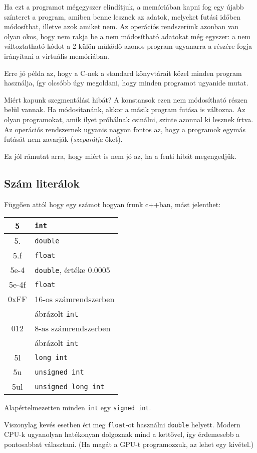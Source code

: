 \documentclass[a4paper,11.5pt]{article}
\begin{document}
	Ha ezt a programot mégegyszer elindítjuk, a memóriában kapni fog egy újabb színteret a program, amiben benne lesznek az adatok, melyeket futási időben módosíthat, illetve azok amiket nem. Az operációs rendszerünk azonban van olyan okos, hogy nem rakja be a nem módosítható adatokat még egyszer: a nem változtatható kódot a 2 külön működő azonos program ugyanarra a részére fogja irányítani a virtuális memóriában.
	
	\medskip
	Erre jó példa az, hogy a C-nek a standard könyvtárait közel minden program használja, így olcsóbb úgy megoldani, hogy minden programot ugyanide mutat.
	
	\medskip
	Miért kapunk szegmentálási hibát? A konstansok ezen nem módosítható részen belül vannak. Ha módosítanánk, akkor a másik program futása is változna. Az olyan programokat, amik ilyet próbálnak csinálni, szinte azonnal ki lesznek írtva. Az operációs rendszernek ugyanis nagyon fontos az, hogy a programok egymás futását nem zavarják (\textit{szeparálja} őket).
	
	\medskip
	Ez jól rámutat arra, hogy miért is nem jó az, ha a fenti hibát megengedjük.
	\subsection{Szám literálok} %
	Függően attól hogy egy számot hogyan írunk c++ban, mást jelenthet:
	\begin{center}
		\begin{tabular}{|c|l|}
			\hline
			5&\texttt{int}\\
			\hline
			5.&\texttt{double}\\
			\hline
			5.f&\texttt{float}\\
			\hline
			5e-4&\texttt{double}, értéke 0.0005\\
			\hline
			5e-4f&\texttt{float}\\
			\hline
			0xFF&{16-os számrendszerben}\\
			& ábrázolt \texttt{int}\\
			\hline
			012&{8-as számrendszerben}\\
			&ábrázolt \texttt{int}\\
			\hline
			5l&\texttt{long int}\\
			\hline
			5u&\texttt{unsigned int}\\
			\hline
			5ul&\texttt{unsigned long int}\\
			\hline
		\end{tabular}
		\end{center}
	\begin{note}
		Alapértelmezetten minden \texttt{int} egy \texttt{signed int}.
	\end{note}
	\begin{note}
		Viszonylag kevés esetben éri meg \texttt{float}-ot használni \texttt{double} helyett. Modern CPU-k ugyanolyan hatékonyan dolgoznak mind a kettővel, így érdemesebb a pontosabbat választani. (Ha magát a GPU-t programozzuk, az lehet egy kivétel.)
	\end{note}
	
\end{document}
